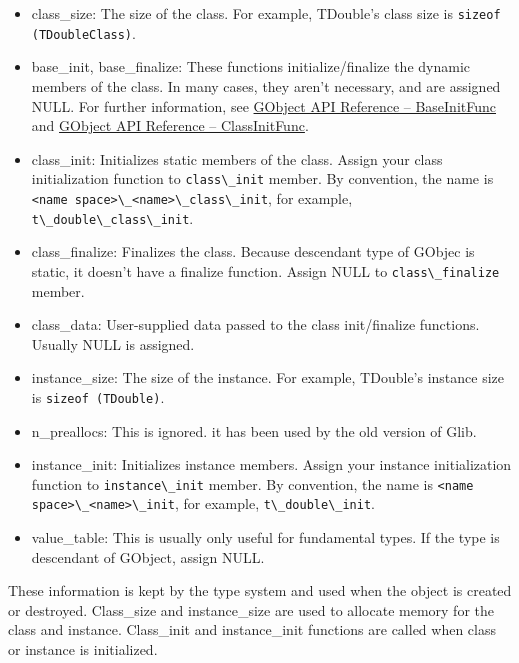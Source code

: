 \begin{itemize}
\tightlist
\item
  class\_size: The size of the class. For example, TDouble's class size
  is \passthrough{\lstinline!sizeof (TDoubleClass)!}.
\item
  base\_init, base\_finalize: These functions initialize/finalize the
  dynamic members of the class. In many cases, they aren't necessary,
  and are assigned NULL. For further information, see
  \href{https://docs.gtk.org/gobject/callback.BaseInitFunc.html}{GObject
  API Reference -- BaseInitFunc} and
  \href{https://docs.gtk.org/gobject/callback.ClassInitFunc.html}{GObject
  API Reference -- ClassInitFunc}.
\item
  class\_init: Initializes static members of the class. Assign your
  class initialization function to \passthrough{\lstinline!class\_init!}
  member. By convention, the name is
  \passthrough{\lstinline!<name space>\_<name>\_class\_init!}, for
  example, \passthrough{\lstinline!t\_double\_class\_init!}.
\item
  class\_finalize: Finalizes the class. Because descendant type of
  GObjec is static, it doesn't have a finalize function. Assign NULL to
  \passthrough{\lstinline!class\_finalize!} member.
\item
  class\_data: User-supplied data passed to the class init/finalize
  functions. Usually NULL is assigned.
\item
  instance\_size: The size of the instance. For example, TDouble's
  instance size is \passthrough{\lstinline!sizeof (TDouble)!}.
\item
  n\_preallocs: This is ignored. it has been used by the old version of
  Glib.
\item
  instance\_init: Initializes instance members. Assign your instance
  initialization function to \passthrough{\lstinline!instance\_init!}
  member. By convention, the name is
  \passthrough{\lstinline!<name space>\_<name>\_init!}, for example,
  \passthrough{\lstinline!t\_double\_init!}.
\item
  value\_table: This is usually only useful for fundamental types. If
  the type is descendant of GObject, assign NULL.
\end{itemize}

These information is kept by the type system and used when the object is
created or destroyed. Class\_size and instance\_size are used to
allocate memory for the class and instance. Class\_init and
instance\_init functions are called when class or instance is
initialized.

